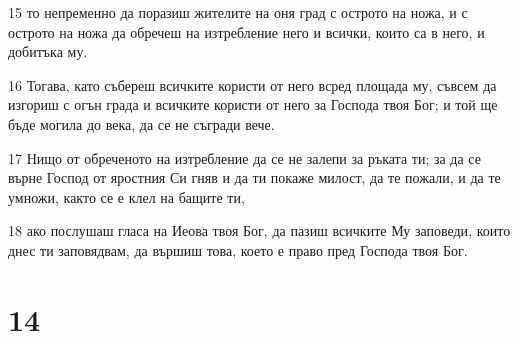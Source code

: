 \par 15 то непременно да поразиш жителите на оня град с острото на ножа, и с острото на ножа да обречеш на изтребление него и всички, които са в него, и добитъка му.
\par 16 Тогава, като събереш всичките користи от него всред площада му, съвсем да изгориш с огън града и всичките користи от него за Господа твоя Бог; и той ще бъде могила до века, да се не съгради вече.
\par 17 Нищо от обреченото на изтребление да се не залепи за ръката ти; за да се върне Господ от яростния Си гняв и да ти покаже милост, да те пожали, и да те умножи, както се е клел на бащите ти,
\par 18 ако послушаш гласа на Иеова твоя Бог, да пазиш всичките Му заповеди, които днес ти заповядвам, да вършиш това, което е право пред Господа твоя Бог.

\chapter{14}

